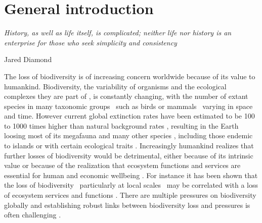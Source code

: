 \chapter{General introduction}
\epigraph{\emph{History, as well as life itself, is complicated; neither life nor history is an enterprise for those who seek simplicity and consistency}}{Jared Diamond}
\label{C01}

The loss of biodiversity is of increasing concern worldwide because of its value to humankind. Biodiversity, the variability of organisms and the ecological complexes they are part of \citep{SecretariatoftheConventiononBiologicalDiversity2014}, is constantly changing, with the number of extant species in many taxonomic groups \textendash\ such as birds \citep{Jetz2012} or mammals \citep{Upham2019} \textendash\ varying in space and time. However current global extinction rates have been estimated to be 100 to 1000 times higher than natural background rates \citep{Pimm2014,Mace2014}, resulting in the Earth loosing most of its megafauna and many other species \citep{Sandom2014,Ceballos2017,Hallmann2017}, including those endemic to islands \citep{Blackburn2004} or with certain ecological traits \citep{Fritz2009}. Increasingly humankind realizes that further losses of biodiversity would be detrimental, either because of its intrinsic value or because of the realization that ecosystem functions and services are essential for human and economic wellbeing \citep{Cardinale2012,Mace2014}. For instance it has been shown that the loss of biodiversity \textendash\ particularly at local scales \textendash\ may be correlated with a loss of ecosystem services \citep{Albrecht2014} and functions \citep{Hautier2015,Isbell2015}. There are multiple pressures on biodiversity globally \citep{Butchart2010,Steffen2015} and establishing robust links between biodiversity loss and pressures is often challenging \citep{Cardinale2018,DePalma2018}.

